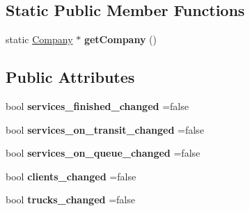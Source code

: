 \subsection*{Static Public Member Functions}
\begin{DoxyCompactItemize}
\item 
\mbox{\label{class_company_a453411f6ef4bab2e878867302fdcf484}} 
static \hyperlink{class_company}{Company} $\ast$ {\bfseries get\+Company} ()
\end{DoxyCompactItemize}
\subsection*{Public Attributes}
\begin{DoxyCompactItemize}
\item 
\mbox{\label{class_company_a0671d8c8afcbe73e5719eac7db205859}} 
bool {\bfseries services\+\_\+finished\+\_\+changed} =false
\item 
\mbox{\label{class_company_aeac99d209136e732106bc0a3dad7d5d1}} 
bool {\bfseries services\+\_\+on\+\_\+transit\+\_\+changed} =false
\item 
\mbox{\label{class_company_a7f986eaf19517385d257ecf74a1a970a}} 
bool {\bfseries services\+\_\+on\+\_\+queue\+\_\+changed} =false
\item 
\mbox{\label{class_company_ab565013c5770e9ac94cc7f2875917f45}} 
bool {\bfseries clients\+\_\+changed} =false
\item 
\mbox{\label{class_company_ae9ee930a4a92e6f048960e486d2783dd}} 
bool {\bfseries trucks\+\_\+changed} =false
\end{DoxyCompactItemize}


